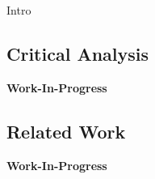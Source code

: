 \documentclass{llncs}
\begin{document}
{		Intro

		
		\subsection{Critical Analysis}
			\label{ss:critical-analysis}
							
			\textbf{Work-In-Progress}		
		
		
		\subsection{Related Work}
			\label{ss:competitor-analysis}
			

			\textbf{Work-In-Progress}
%			
%
%
%
%
%
%
%
%
		
	
}
\end{document}
